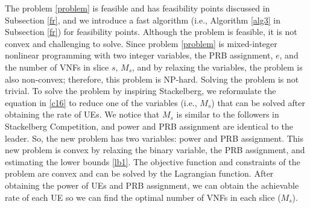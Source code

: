 \documentclass[lettersize,journal]{IEEEtran}
\begin{document}
The problem \eqref{problem} is feasible and has feasibility points discussed in Subsection \ref{fr}, and we introduce a fast algorithm (i.e., Algorithm \ref{alg3}  in Subsection \ref{fr}) for feasibility points. Although the problem is feasible, it is not convex and challenging to solve. Since problem \eqref{problem} is mixed-integer nonlinear programming with two integer variables, the PRB assignment, $e$, and the number of VNFs in slice $s$, $M_s$, and by relaxing the variables, the problem is also non-convex; therefore, this problem is NP-hard. Solving the problem is not trivial. To solve the problem by inspiring Stackelberg, we reformulate the equation in \eqref{c16} to reduce one of the variables (i.e., $M_s$) that can be solved after obtaining the rate of UEs. We notice that $M_s$ is similar to the followers in Stackelberg Competition, and power and PRB assignment are identical to the leader. So, the new problem has two variables: power and PRB assignment. This new problem is convex by relaxing the binary variable, the PRB assignment, and estimating the lower bounds \eqref{lb1}. The objective function and constraints of the problem are convex and can be solved by the Lagrangian function. After obtaining the power of UEs and PRB assignment, we can obtain the achievable rate of each UE so we can find the optimal number of VNFs in each slice ($M_s$).
\end{document}
